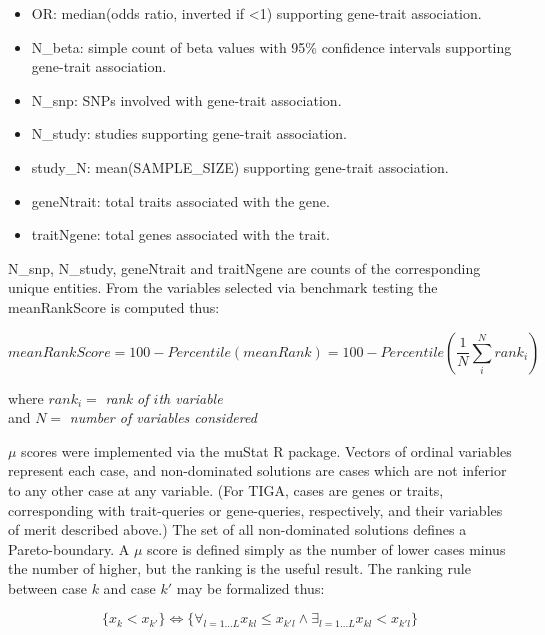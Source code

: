 \begin{itemize}
\item OR: median(odds ratio, inverted if <1) supporting gene-trait association.
\item N\_beta: simple count of beta values with 95\% confidence intervals supporting gene-trait association.
\item N\_snp: SNPs involved with gene-trait association.
\item N\_study: studies supporting gene-trait association.
\item study\_N: mean(SAMPLE\_SIZE) supporting gene-trait association.
\item geneNtrait: total traits associated with the gene.
\item traitNgene: total genes associated with the trait.
\end{itemize}

N\_snp, N\_study, geneNtrait and traitNgene are counts of the corresponding unique entities. From the variables selected via benchmark testing the meanRankScore is computed thus:

\begin{equation}
    meanRankScore = 100 - Percentile(meanRank) = 100 - Percentile(\frac{1}{N} \sum_{i}^{N} rank_{i})
\end{equation}

\begin{center}
    where $ rank_{i} = $ \emph{rank of $ i $th variable}\\
    and $ N = $ \emph{number of variables considered}
\end{center}

$\mu$ scores were implemented via the muStat\cite{Wittkowski2012-fk} R package. Vectors of ordinal variables represent each case, and non-dominated solutions are cases which are not inferior to any other case at any variable. (For TIGA, cases are genes or traits, corresponding with trait-queries or gene-queries, respectively, and their variables of merit described above.) The set of all non-dominated solutions defines a Pareto-boundary. A $\mu$ score is defined simply as the number of lower cases minus the number of higher, but the ranking is the useful result. The ranking rule between case $k$ and case $k'$ may be formalized thus:

\begin{equation}
    \{ x_k < x_{k'} \} \Leftrightarrow \{ \forall_{l=1...L} x_{kl} \leq x_{k'l} \wedge \exists_{l=1...L} x_{kl} < x_{k'l} \}
\end{equation}


